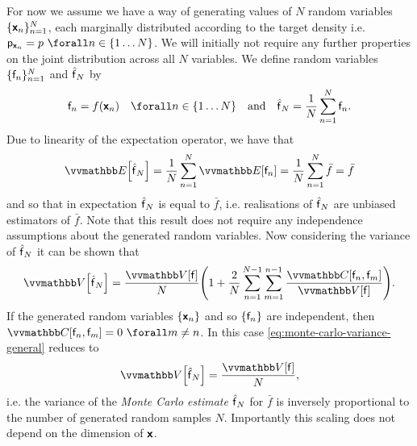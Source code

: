For now we assume we have a way of generating values of $N$ random variables $\lbrace \boldsymbol{\mathsf{x}}_n\rbrace_{n=1}^N$, each marginally distributed according to the target density i.e. $\pden{\rvct{x}_n} = \tgtdens ~\forall n \in \fset{1 \dots N}$. We will initially not require any further properties on the joint distribution across all $N$ variables. We define random variables  $\lbrace \mathsf{f}_n \rbrace_{n=1}^N$ and $\hatf_N$ by
\begin{equation}
  \rvar{f}_n = f\lpa\rvct{x}_n\rpa \quad\forall n \in \fset{1\dots N}
  \quad\textrm{and}\quad
  \hatf_N = \frac{1}{N} \sum_{n=1}^N \rvar{f}_n.
\end{equation}
Due to linearity of the expectation operator, we have that
\begin{equation}
  \expc{\hatf_N} = 
  \frac{1}{N} \sum_{n=1}^N \expc{\rvar{f}_n} = 
  \frac{1}{N} \sum_{n=1}^N \bar{f} = 
  \bar{f}
\end{equation}
and so that in expectation $\hatf_N$ is equal to $\bar{f}$, i.e. realisations of $\hatf_N$ are unbiased estimators of $\bar{f}$. Note that this result does not require any independence assumptions about the generated random variables. Now considering the variance of $\hatf_N$ it can be shown that
\begin{align}\label{eq:monte-carlo-variance-general}
  \var{\hatf_N}
  =
  \frac{\var{\rvar{f}}}{N}
  \lpa 
    1 +\frac{2}{N}\sum_{n=1}^{N-1} \sum_{m=1}^{n-1} \frac{\cov{\rvar{f}_n, \rvar{f}_m}}{\var{\rvar{f}}}
  \rpa.
\end{align}
If the generated random variables $\lbrace \boldsymbol{\mathsf{x}}_n\rbrace$ and so $\lbrace \mathsf{f}_n\rbrace$ are independent, then $\cov{\rvar{f}_n, \rvar{f}_m} = 0 ~\forall m\neq n$. In this case \eqref{eq:monte-carlo-variance-general} reduces to
\begin{equation}\label{eq:monte-carlo-variance-independent}
  \var{\hatf_N}
  =
  \frac{\var{\rvar{f}}}{N},
\end{equation}
i.e. the variance of the \emph{Monte Carlo estimate} $\hatf_N$ for $\bar{f}$ is inversely proportional to the number of generated random samples $N$. Importantly this scaling does not depend on the dimension of $\boldsymbol{\mathsf{x}}$. 

